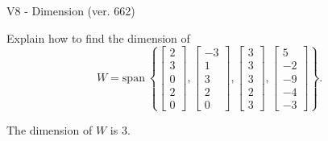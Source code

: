 \begin{exercise}
  \begin{exerciseTitle}V8 - Dimension (ver. 662)\end{exerciseTitle}
  \begin{exerciseStatement}
    Explain how to find the dimension of 
\[W=\mathrm{span}\ \left\{\left[\begin{array}{r}
2 \\
3 \\
0 \\
2 \\
0
\end{array}\right] , \left[\begin{array}{r}
-3 \\
1 \\
3 \\
2 \\
0
\end{array}\right] , \left[\begin{array}{r}
3 \\
3 \\
3 \\
2 \\
3
\end{array}\right] , \left[\begin{array}{r}
5 \\
-2 \\
-9 \\
-4 \\
-3
\end{array}\right]\right\}.\]



  \end{exerciseStatement}
  \begin{exerciseAnswer}
   The dimension of \(W\) is  \(3\).
  


  \end{exerciseAnswer}
\end{exercise}